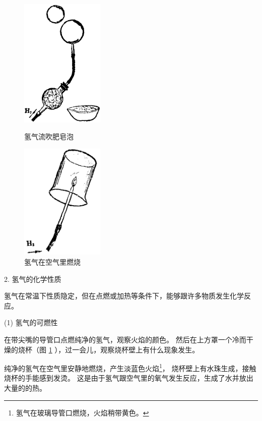 \begin{figure}[htbp]
    \centering
    \begin{minipage}[b]{7cm}
        \centering
        \includegraphics[width=4cm]{../pic/czhx1-ch2-7}
        \caption{氢气流吹肥皂泡}\label{fig:2-7}
    \end{minipage}
    \qquad
    \begin{minipage}[b]{7cm}
        \centering
        \includegraphics[width=4cm]{../pic/czhx1-ch2-8}
        \caption{氢气在空气里燃烧}\label{fig:2-8}
    \end{minipage}
\end{figure}

2. 氢气的化学性质

氢气在常温下性质隐定，但在点燃或加热等条件下，能够跟许多物质发生化学反应。

(1) 氢气的可燃性

\begin{shiyan}
    在带尖嘴的导管口点燃纯净的氢气，观察火焰的颜色。
    然后在上方罩一个冷而干燥的烧杯（图 \ref{fig:2-8} ），过一会儿，观察烧杯壁上有什么现象发生。
\end{shiyan}

纯净的氢气在空气里安静地燃烧，产生淡蓝色火焰\footnote{氢气在玻璃导管口燃烧，火焰稍带黄色。}，
烧杯壁上有水珠生成，接触烧杯的手能感到发烫。
这是由于氢气跟空气里的氧气发生反应，生成了水并放出大量的的热。
\begin{fangchengshi}
\end{fangchengshi}

